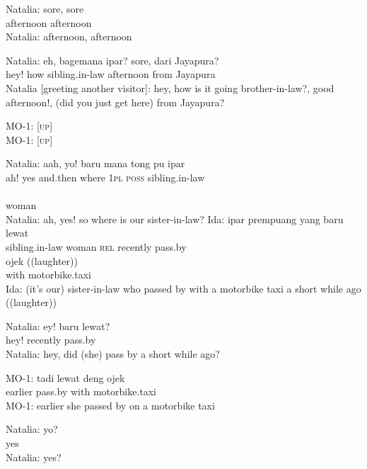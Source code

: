 \ea
\gll   Natalia:   sore,   sore\\
  {}   afternoon   afternoon\\
\glt
Natalia: afternoon, afternoon
\z

\ea
\gll   Natalia:   eh,   bagemana   ipar?   sore,   dari   Jayapura?\\
 {}    hey!   how   sibling.in-law   afternoon   from   Jayapura\\
\glt
Natalia [greeting another visitor]: hey, how is it going brother-in-law?, good afternoon!, (did you just get here) from Jayapura?
\z

\ea
\gll   MO-1:   {\upshape\textsc{[up]}}\\
MO-1: [\textsc{up}]\\
\z

\ea
\gll   Natalia:   aah,   yo!   baru   mana   tong   pu   ipar\\
{}     ah!   yes   and.then   where   \textsc{1pl}   \textsc{poss}   sibling.in-law\\
\\
       {woman}\\
\glt
Natalia: ah, yes! so where is our sister-in-law?
\z
\ea
\gll   Ida:    {ipar}   prempuang   yang   baru   lewat\\
  {}    {sibling.in-law}   woman   \textsc{rel}   recently   pass.by\\
\hspace{1cm}  {ojek}    {((laughter))}\\
   {with}\hspace{1cm}  {motorbike.taxi}    {}\\
\glt
Ida: (it’s our) sister-in-law who passed by with a motorbike taxi a short while ago ((laughter))
\z

\ea
\gll   Natalia:   ey!   baru   lewat?\\
 {}     hey!   recently   pass.by\\
\glt
Natalia: hey, did (she) pass by a short while ago?
\z

\ea
\gll   MO-1:   tadi   lewat   deng   ojek\\
 {}    earlier   pass.by   with   motorbike.taxi\\
\glt
MO-1: earlier she passed by on a motorbike taxi
\z

\ea
\gll   Natalia:   yo?\\
{}     yes\\
\glt
Natalia: yes?
\z

